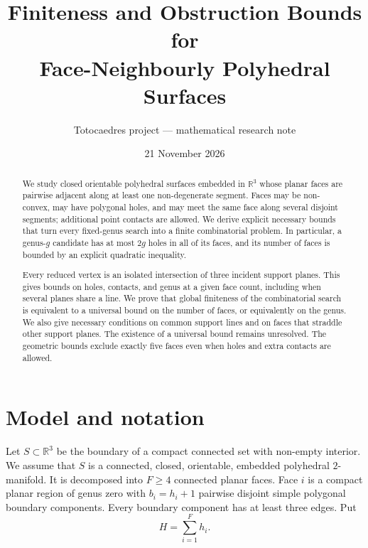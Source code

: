 \documentclass[11pt,a4paper]{article}
\title{Finiteness and Obstruction Bounds for\\
Face-Neighbourly Polyhedral Surfaces}
\author{Totocaedres project --- mathematical research note}
\date{21 November 2026}
\theoremstyle{definition}
\newcommand{\R}{\mathbb{R}}
\begin{document}
\maketitle

\begin{abstract}
We study closed orientable polyhedral surfaces embedded in $\R^3$ whose
planar faces are pairwise adjacent along at least one non-degenerate segment.
Faces may be non-convex, may have polygonal holes, and may meet the same face
along several disjoint segments; additional point contacts are allowed.  We
derive explicit necessary bounds that turn every fixed-genus search into a
finite combinatorial problem.  In particular, a genus-$g$ candidate has at
most $2g$ holes in all of its faces, and its number of faces is bounded by an
explicit quadratic inequality.

Every reduced vertex is an isolated intersection of three incident support
planes. This gives bounds on holes, contacts, and genus at a given face count,
including when several planes share a line. We prove that global finiteness
of the combinatorial search is equivalent to a universal bound on the number
of faces, or equivalently on the genus. We also give necessary conditions on
common support lines and on faces that straddle other support planes. The
existence of a universal bound remains unresolved. The geometric bounds
exclude exactly five faces even when holes and extra contacts are allowed.
\end{abstract}

\section{Model and notation}

Let $S\subset\R^3$ be the boundary of a compact connected set with non-empty
interior.  We assume that $S$ is a connected, closed, orientable, embedded
polyhedral $2$-manifold.  It is decomposed into $F\geq4$ connected planar
faces.  Face $i$ is a compact planar region of genus zero with
$b_i=h_i+1$ pairwise disjoint simple polygonal boundary components.  Every
boundary component has at least three edges.  Put
\[
    H=\sum_{i=1}^{F} h_i.
\]
\end{document}
